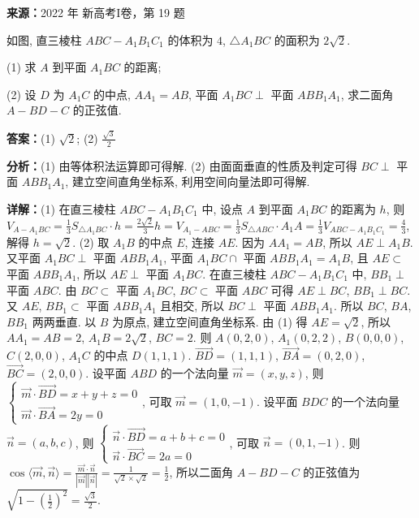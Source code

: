 \begin{question}[points=12]
\textbf{来源：}2022 年 新高考I卷，第 19 题\par
如图, 直三棱柱 $ABC - A_1B_1C_1$ 的体积为 $4$, $\triangle A_1BC$ 的面积为 $2\sqrt{2}$.

(1) 求 $A$ 到平面 $A_1BC$ 的距离;

(2) 设 $D$ 为 $A_1C$ 的中点, $AA_1 = AB$, 平面 $A_1BC \perp$ 平面 $ABB_1A_1$, 求二面角 $A - BD - C$ 的正弦值.
\begin{solution}
\textbf{答案：}(1) $\sqrt{2}$; (2) $\frac{\sqrt{3}}{2}$

\textbf{分析：}(1) 由等体积法运算即可得解. (2) 由面面垂直的性质及判定可得 $BC \perp$ 平面 $ABB_1A_1$, 建立空间直角坐标系, 利用空间向量法即可得解.

\textbf{详解：}(1) 在直三棱柱 $ABC - A_1B_1C_1$ 中, 设点 $A$ 到平面 $A_1BC$ 的距离为 $h$, 则 $V_{A-A_1BC} = \frac{1}{3}S_{\triangle A_1BC} \cdot h = \frac{2\sqrt{2}}{3}h = V_{A_1-ABC} = \frac{1}{3}S_{\triangle ABC} \cdot A_1A = \frac{1}{3}V_{ABC-A_1B_1C_1} = \frac{4}{3}$, 解得 $h = \sqrt{2}$.
(2) 取 $A_1B$ 的中点 $E$, 连接 $AE$. 因为 $AA_1 = AB$, 所以 $AE \perp A_1B$. 又平面 $A_1BC \perp$ 平面 $ABB_1A_1$, 平面 $A_1BC \cap$ 平面 $ABB_1A_1 = A_1B$, 且 $AE \subset$ 平面 $ABB_1A_1$, 所以 $AE \perp$ 平面 $A_1BC$. 在直三棱柱 $ABC - A_1B_1C_1$ 中, $BB_1 \perp$ 平面 $ABC$. 由 $BC \subset$ 平面 $A_1BC$, $BC \subset$ 平面 $ABC$ 可得 $AE \perp BC$, $BB_1 \perp BC$. 又 $AE$, $BB_1 \subset$ 平面 $ABB_1A_1$ 且相交, 所以 $BC \perp$ 平面 $ABB_1A_1$. 所以 $BC$, $BA$, $BB_1$ 两两垂直. 以 $B$ 为原点, 建立空间直角坐标系. 由 (1) 得 $AE = \sqrt{2}$, 所以 $AA_1 = AB = 2$, $A_1B = 2\sqrt{2}$, $BC = 2$. 则 $A(0,2,0)$, $A_1(0,2,2)$, $B(0,0,0)$, $C(2,0,0)$, $A_1C$ 的中点 $D(1,1,1)$. $\overrightarrow{BD} = (1,1,1)$, $\overrightarrow{BA} = (0,2,0)$, $\overrightarrow{BC} = (2,0,0)$. 设平面 $ABD$ 的一个法向量 $\vec{m} = (x,y,z)$, 则 $\begin{cases} \vec{m} \cdot \overrightarrow{BD} = x + y + z = 0 \\ \vec{m} \cdot \overrightarrow{BA} = 2y = 0 \end{cases}$, 可取 $\vec{m} = (1,0,-1)$. 设平面 $BDC$ 的一个法向量 $\vec{n} = (a,b,c)$, 则 $\begin{cases} \vec{n} \cdot \overrightarrow{BD} = a + b + c = 0 \\ \vec{n} \cdot \overrightarrow{BC} = 2a = 0 \end{cases}$, 可取 $\vec{n} = (0,1,-1)$. 则 $\cos\langle\vec{m},\vec{n}\rangle = \frac{\vec{m} \cdot \vec{n}}{|\vec{m}| |\vec{n}|} = \frac{1}{\sqrt{2} \times \sqrt{2}} = \frac{1}{2}$, 所以二面角 $A - BD - C$ 的正弦值为 $\sqrt{1 - \left(\frac{1}{2}\right)^2} = \frac{\sqrt{3}}{2}$.
\end{solution}
\end{question}

